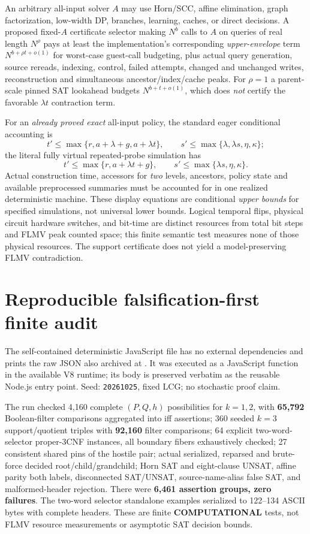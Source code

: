 \documentclass[11pt]{article}
\begin{document}
An arbitrary all-input solver $A$ may use Horn/SCC, affine
elimination, graph factorization, low-width DP, branches,
learning, caches, or direct decisions. A proposed fixed-$A$
certificate selector making $N^b$ calls to $A$ on queries
of real length $N^\rho$ pays at least the implementation's
corresponding \emph{upper-envelope} term
$N^{b+\rho t+o(1)}$ for worst-case guest-call budgeting,
plus actual query generation, source rereads, indexing,
control, failed attempts, changed and unchanged writes,
reconstruction and simultaneous ancestor/index/cache peaks.
For $\rho=1$ a parent-scale pinned SAT lookahead budgets
$N^{b+t+o(1)}$, which does \emph{not} certify the favorable
$\lambda t$ contraction term.

For an \emph{already proved exact} all-input policy, the
standard eager conditional accounting is
\[
t'\le\max\{r,a+\lambda+g,a+\lambda t\},\qquad
s'\le\max\{\lambda,\lambda s,\eta,\kappa\};
\]
the literal fully virtual repeated-probe simulation has
\[
t'\le\max\{r,a+\lambda t+g\},\qquad
s'\le\max\{\lambda s,\eta,\kappa\}.
\]
Actual construction time, accessors for \emph{two} levels,
ancestors, policy state and available preprocessed summaries
must be accounted for in one realized deterministic machine.
These display equations are conditional \emph{upper bounds}
for specified simulations, not universal lower bounds.
Logical temporal flips, physical circuit hardware switches,
and bit-time are distinct resources from total bit steps and
FLMV peak counted space; this finite semantic test measures
none of those physical resources. The support certificate
does not yield a model-preserving FLMV contradiction.

\section{Reproducible falsification-first finite audit}
The self-contained deterministic JavaScript file
has no external dependencies and prints the raw JSON also archived at
.
It was executed as a JavaScript function in the available V8 runtime;
its body is preserved verbatim as the reusable Node.js entry point.
Seed: \texttt{20261025}, fixed LCG; no stochastic proof claim.

The run checked 4,160 complete $(P,Q,h)$ possibilities for
$k=1,2$, with \textbf{65,792} Boolean-filter comparisons
aggregated into iff assertions; 360 seeded $k=3$
support/quotient triples with \textbf{92,160} filter
comparisons; 64 explicit two-word-selector proper-3CNF
instances, all boundary fibers exhaustively checked;
27 consistent shared pins of the hostile pair;
actual serialized, reparsed and brute-force decided
root/child/grandchild; Horn SAT and eight-clause UNSAT,
affine parity both labels, disconnected SAT/UNSAT,
source-name-alias false SAT, and malformed-header rejection.
There were \textbf{6,461 assertion groups, zero failures}.
The two-word selector standalone examples serialized to
122--134 ASCII bytes with complete headers.
These are finite \textbf{COMPUTATIONAL} tests, not FLMV
resource measurements or asymptotic SAT decision bounds.
\end{document}
